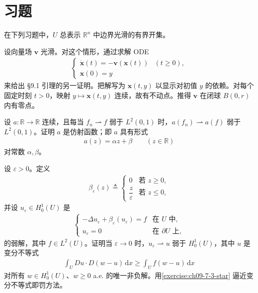 \documentclass[../../main.tex]{subfiles}
\begin{document}
\section{习题}\label{section:ch09-7-习题}

在下列习题中，$U$ 总表示 $\mathbb{R}^n$ 中边界光滑的有界开集。

\begin{exercise}\label{exercise:ch09-7-1}
设向量场 $\mathbf{v}$ 光滑。对这个情形，通过求解 ODE
\begin{align*}
\begin{cases}\dot{\mathbf{x}}(t)=-\mathbf{v}(\mathbf{x}(t))&(t\geqslant 0),\\ \mathbf{x}(0)=y\end{cases}
\end{align*}
来给出 \S9.1 引理的另一证明。把解写为 $\mathbf{x}(t,y)$ 以显示对初值 $y$ 的依赖。对每个固定时刻 $t>0$，映射 $y\mapsto\mathbf{x}(t,y)$ 连续，故有不动点。推得 $\mathbf{v}$ 在闭球 $B(0,r)$ 内有零点。
\end{exercise}

\begin{exercise}\label{exercise:ch09-7-2}
设 $a:\mathbb{R}\to\mathbb{R}$ 连续，且每当 $f_n\rightharpoonup f$ 弱于 $L^2(0,1)$ 时，$a(f_n)\rightharpoonup a(f)$ 弱于 $L^2(0,1)$。证明 $a$ 是仿射函数；即 $a$ 具有形式
\begin{align*}
a(z)=\alpha z+\beta\qquad (z\in\mathbb{R})
\end{align*}
对常数 $\alpha,\beta$。
\end{exercise}

\begin{exercise}[罚方法]\label{exercise:ch09-7-3}设 $\varepsilon>0$。定义
\begin{align*}
\beta_\varepsilon(z)\triangleq\begin{cases}0&\text{若 }z\geqslant 0,\\ \dfrac z\varepsilon&\text{若 }z\leqslant 0,\end{cases}
\end{align*}
并设 $u_\varepsilon\in H_0^1(U)$ 是
\begin{align}
\begin{cases}
-\Delta u_\varepsilon+\beta_\varepsilon(u_\varepsilon)=f&\text{在 }U\text{ 中},\\
u_\varepsilon=0&\text{在 }\partial U\text{ 上},
\end{cases}\label{exercise:ch09-7-3-star}
\end{align}
的弱解，其中 $f\in L^2(U)$。证明当 $\varepsilon\to 0$ 时，$u_\varepsilon\rightharpoonup u$ 弱于 $H_0^1(U)$，其中 $u$ 是变分不等式
\begin{align*}
\int_U Du\cdot D(w-u)\,\mathrm{d}x\geqslant\int_U f(w-u)\,\mathrm{d}x
\end{align*}
对所有 $w\in H_0^1(U)$、$w\geqslant 0$ a.e. 的唯一非负解。用\eqref{exercise:ch09-7-3-star} 逼近变分不等式即罚方法。
\end{exercise}
\end{document}
